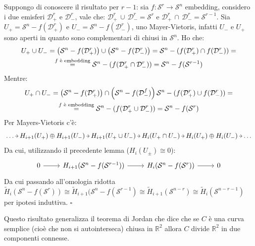 \documentclass[10pt, twoside=false, x11names]{scrbook}
\newenvironment{proof}{{\textbf{Dimostrazione}:}}{\hfill $\square$}
\newcommand{\RN}[1][]{\mathbb{R}^#1}
\newcommand{\Sph}[1][]{\mathcal{S}^#1}
\newcommand{\Disk}[1][]{\mathcal{D}^#1}
\let\setminus-
\begin{document}
\begin{proof}
  Suppongo di conoscere il risultato per $ r - 1 $: sia
  $ f \colon \Sph{r} \to \Sph{n} $ embedding, considero i due emisferi
  $ \Disk{r}_+ $ e $ \Disk{r}_- $, vale che:
  $ \Disk{r}_+ \, \cup \, \Disk{r}_- = \Sph{r} $ e
  $ \Disk{r}_+ \, \cap \, \Disk{r}_- = \Sph{r-1} $. Sia
  $ U_+ = \Sph{n} \setminus f(\Disk{r}_+) $ e
  $ U_- = \Sph{n} \setminus f(\Disk{r}_-) $, uno Mayer-Vietoris, infatti $ U_- $ e
  $ U_+ $ sono aperti in quanto sono complementari di chiusi in $ \Sph{n} $.
  Ho che:
  \begin{gather*}
    U_+ \cup U_- = \left(\Sph{n} \setminus f(\Disk{r}_+) \right) \cup \left( \Sph{n} \setminus f(\Disk{r}_-) \right) =
    \Sph{n} \setminus (f(\Disk{r}_+) \cap  f(\Disk{r}_-)) = \\
   \overset{\text{$ f $ è embedding}} {=}  \Sph{n} \setminus (f(\Disk{r}_+  \cap  \Disk{r}_-)) = \Sph{n} \setminus f(\Sph{r-1})
  \end{gather*}
  Mentre:
  \begin{gather*}
    U_+ \cap U_- = \left(\Sph{n} \setminus f(\Disk{r}_+) \right) \cap \left(\Sph{n} \setminus f(\Disk{f}_-) \right)
    \Sph{n} \setminus (f(\Disk{r}_+) \cup  f(\Disk{r}_-)) = \\
    \overset{\text{$ f $ è embedding}} {=}  \Sph{n} \setminus (f(\Disk{r}_+  \cup  \Disk{r}_-)) = \Sph{n} \setminus f(\Sph{r})
  \end{gather*}
  Per Mayers-Vietoris c'è:
  \[
    \begin{tikzcd}[nodes={column sep = 5pt, inner sep = 2pt}]
      \dots \rar & H_{i+1}(U_+) \oplus H_{i+1}(U_-) \rar & H_{i+1}(U_+ \cup U_-) \rar & H_i(U_+ \cap U_-) \rar & H_i (U_+) \oplus H_i(U_-)
      \rar & \dots
    \end{tikzcd}
  \]
  Da cui, utilizzando il precedente lemma ($ H_i(U_\pm) \cong 0 $):
  \[
    \begin{tikzcd}
      0 \rar & H_{i+1}(\Sph{n} - f(\Sph{r-1})) \rar & H_i(\Sph{n} \setminus f(\Sph{r})) \rar & 0
    \end{tikzcd}
  \]
  Da cui passando all'omologia ridotta
  $ \tilde{H}_i(\Sph{n} \setminus f(\Sph{r})) \cong \tilde{H}_{i+1}(\Sph{n} - f(\Sph{r-1}) \cong \tilde{H}_{i+1}(\Sph{n-r}) \cong \tilde{H}_i(\Sph{n-r-1}) $
  per ipotesi induttiva.
\end{proof}

Questo risultato generalizza il teorema di Jordan che
dice che se $ C $ è una curva semplice (cioè che non si autointerseca) chiusa in
$ \RN{2} $ allora $ C $ divide $ \RN{2} $ in due componenti connesse.
\end{document}
